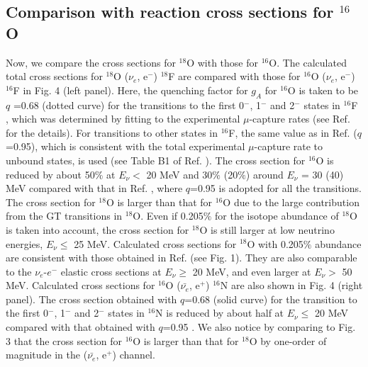 \documentclass[preprint,12pt]{elsarticle}
\begin{document}
\subsection{Comparison with reaction cross sections for $^{16}$O}
Now, we compare the cross sections for $^{18}$O with those for $^{16}$O.
The calculated total cross sections for $^{18}$O ($\nu_e$, e$^{-}$) $^{18}$F are compared with those for $^{16}$O ($\nu_e$, e$^{-}$) $^{16}$F in Fig. 4 (left panel).
Here, the quenching factor for $g_A$ for $^{16}$O is taken to be $q$ =0.68 (dotted curve) for the transitions to the first 0$^{-}$, 1$^{-}$ and 2$^{-}$ states in $^{16}$F \cite{PTEP2022}, which was determined by fitting to the experimental $\mu$-capture rates (see Ref. \cite{PTEP2022} for the details).
For transitions to other states in $^{16}$F, the same value as in Ref. \cite{SC2018} ($q$=0.95), which is consistent with the total experimental $\mu$-capture rate to unbound states, is used (see Table B1 of Ref. \cite{PTEP2022}).
The cross section for $^{16}$O is reduced by about 50$\%$ at $E_{\nu}<$ 20 MeV and 30$\%$ (20$\%$) around $E_{\nu}$ = 30 (40) MeV compared with that in Ref. \cite{SC2018}, where $q$=0.95 is adopted for all the transitions.
The cross section for $^{18}$O is larger than that for $^{16}$O due to the large contribution from the GT transitions in $^{18}$O.
Even if 0.205$\%$ for the isotope abundance of $^{18}$O is taken into account, the cross section for $^{18}$O is still larger at low neutrino energies, $E_{\nu}\leq$ 25 MeV.
Calculated cross sections for $^{18}$O with 0.205$\%$ abundance are consistent with those obtained in Ref. \cite{Haxton} (see Fig. 1).
They are also comparable to the $\nu_{e}$-$e^{-}$ elastic cross sections at $E_{\nu}\geq$ 20 MeV, and even larger at $E_{\nu}>$ 50 MeV.
Calculated cross sections for $^{16}$O ($\bar{\nu_e}$, e$^{+}$) $^{16}$N are also shown in Fig. 4 (right panel). The cross section obtained with $q$=0.68 (solid curve) for the transition to the first 0$^{-}$, 1$^{-}$ and 2$^{-}$ states in $^{16}$N is reduced by about half at $E_{\nu}\leq$ 20 MeV compared with that obtained with $q$=0.95 \cite{SC2018}. 
We also notice by comparing to Fig. 3 that the cross section for $^{16}$O is larger than that for $^{18}$O by one-order of magnitude in the ($\bar{\nu_e}$, e$^{+}$) channel.
\end{document}
